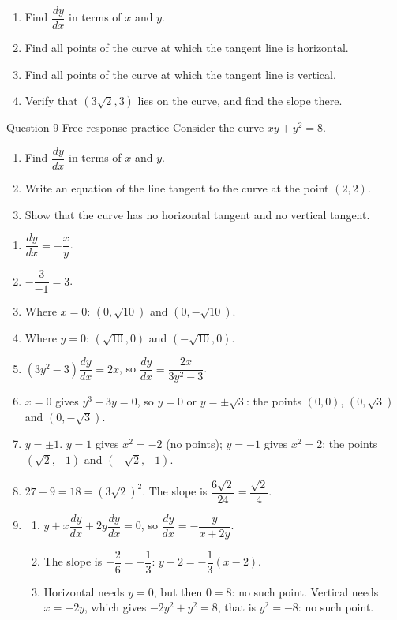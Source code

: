 \documentclass[11pt]{article}
\begin{document}
\begin{enumerate}[leftmargin=*,itemsep=2pt,start=5]
  \item Find $\dfrac{dy}{dx}$ in terms of $x$ and $y$.\work{2.8cm}
  \item Find all points of the curve at which the tangent line is horizontal.\work{2.8cm}
  \item Find all points of the curve at which the tangent line is vertical.\work{2.8cm}
  \item Verify that $\left(3\sqrt2,3\right)$ lies on the curve, and find the slope there.\work{2.8cm}
\end{enumerate}

\begin{frbox}{Question 9 \textperiodcentered{} Free-response practice}
Consider the curve $xy+y^2=8$.
\begin{enumerate}[label=(\alph*),leftmargin=*,itemsep=2pt]
  \item Find $\dfrac{dy}{dx}$ in terms of $x$ and $y$.\work{2.6cm}
  \item Write an equation of the line tangent to the curve at the point $(2,2)$.\work{2.6cm}
  \item Show that the curve has no horizontal tangent and no vertical tangent.\work{2.6cm}
\end{enumerate}
\end{frbox}

\newpage
\begin{solbox}
\begin{enumerate}[leftmargin=*,itemsep=4pt]
  \item $\dfrac{dy}{dx}=-\dfrac xy$.
  \item $-\dfrac{3}{-1}=3$.
  \item Where $x=0$: $\left(0,\sqrt{10}\right)$ and $\left(0,-\sqrt{10}\right)$.
  \item Where $y=0$: $\left(\sqrt{10},0\right)$ and $\left(-\sqrt{10},0\right)$.
  \item $\left(3y^2-3\right)\dfrac{dy}{dx}=2x$, so $\dfrac{dy}{dx}=\dfrac{2x}{3y^2-3}$.
  \item $x=0$ gives $y^3-3y=0$, so $y=0$ or $y=\pm\sqrt3$: the points $(0,0)$, $\left(0,\sqrt3\right)$ and $\left(0,-\sqrt3\right)$.
  \item $y=\pm1$. $y=1$ gives $x^2=-2$ (no points); $y=-1$ gives $x^2=2$: the points $\left(\sqrt2,-1\right)$ and $\left(-\sqrt2,-1\right)$.
  \item $27-9=18=\left(3\sqrt2\right)^2$. The slope is $\dfrac{6\sqrt2}{24}=\dfrac{\sqrt2}{4}$.
  \item \begin{enumerate}[label=(\alph*),leftmargin=*,itemsep=3pt]
    \item $y+x\dfrac{dy}{dx}+2y\dfrac{dy}{dx}=0$, so $\dfrac{dy}{dx}=-\dfrac{y}{x+2y}$.
    \item The slope is $-\dfrac{2}{6}=-\dfrac13$: $y-2=-\dfrac13(x-2)$.
    \item Horizontal needs $y=0$, but then $0=8$: no such point. Vertical needs $x=-2y$, which gives $-2y^2+y^2=8$, that is $y^2=-8$: no such point.
  \end{enumerate}
\end{enumerate}
\end{solbox}
\end{document}
